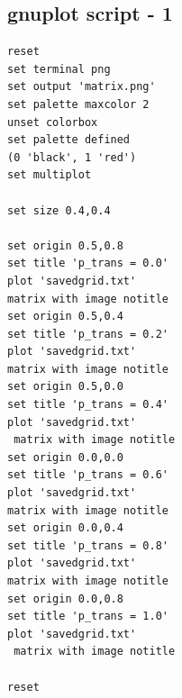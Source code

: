 \documentclass[twocolumn]{article}
\begin{document}
\subsection{gnuplot script - 1}
\begin{verbatim}
reset
set terminal png
set output 'matrix.png'
set palette maxcolor 2
unset colorbox
set palette defined 
(0 'black', 1 'red')
set multiplot

set size 0.4,0.4

set origin 0.5,0.8
set title 'p_trans = 0.0'
plot 'savedgrid.txt' 
matrix with image notitle
set origin 0.5,0.4
set title 'p_trans = 0.2'
plot 'savedgrid.txt' 
matrix with image notitle
set origin 0.5,0.0
set title 'p_trans = 0.4'
plot 'savedgrid.txt'
 matrix with image notitle
set origin 0.0,0.0
set title 'p_trans = 0.6'
plot 'savedgrid.txt' 
matrix with image notitle
set origin 0.0,0.4
set title 'p_trans = 0.8'
plot 'savedgrid.txt' 
matrix with image notitle
set origin 0.0,0.8
set title 'p_trans = 1.0'
plot 'savedgrid.txt'
 matrix with image notitle

reset
\end{verbatim}
\end{document}
